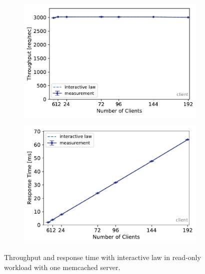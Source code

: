 \documentclass[11pt,a4paper]{article}
\begin{document}
\begin{figure}
	\begin{subfigure}[b]{.49\linewidth}
		\centering
		\includegraphics[width=\linewidth]{data/exp21_ro_tp_nc.pdf}
	\end{subfigure}\hfill
	\begin{subfigure}[b]{.49\linewidth}
		\centering
		\includegraphics[width=\linewidth]{data/exp21_ro_rt_nc.pdf}
	\end{subfigure}%
	\caption{Throughput and response time with interactive law in read-only workload with one memcached server.}
	\label{exp21_ro_nc}
\end{figure}
\end{document}
